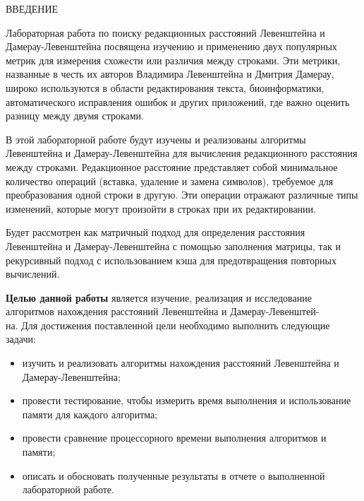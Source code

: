 \begin{center}
	ВВЕДЕНИЕ
\end{center}

Лабораторная работа по поиску редакционных расстояний Левенштейна и Дамерау-Левенштейна посвящена изучению и применению двух популярных метрик для измерения схожести или различия между строками. Эти метрики, названные в честь их авторов Владимира Левенштейна и Дмитрия Дамерау, широко используются в области редактирования текста, биоинформатики, автоматического исправления ошибок и других приложений, где важно оценить разницу между двумя строками.

В этой лабораторной работе будут изучены и реализованы алгоритмы Левенштейна и Дамерау-Левенштейна для вычисления редакционного расстояния между строками. Редакционное расстояние представляет собой минимальное количество операций (вставка, удаление и замена символов), требуемое для преобразования одной строки в другую. Эти операции отражают различные типы изменений, которые могут произойти в строках при их редактировании.

Будет рассмотрен как матричный подход для определения расстояния Левенштейна и Дамерау-Левенштейна с помощью заполнения матрицы, так и рекурсивный подход с использованием кэша для предотвращения повторных вычислений. 

\textbf{Целью данной работы} является изучение, реализация и исследование алгоритмов нахождения расстояний Левенштейна и Дамерау-Левенштей-\\на. 
Для достижения поставленной цели необходимо выполнить следующие задачи:
\begin{itemize}
	\item изучить и реализовать алгоритмы нахождения расстояний Левенштейна и Дамерау-Левенштейна;
    \item провести тестирование, чтобы измерить время выполнения и использование памяти для каждого алгоритма;
    \item провести сравнение процессорного времени выполнения алгоритмов и памяти;
	\item описать и обосновать полученные результаты в отчете о выполненной лабораторной работе.
\end{itemize}
